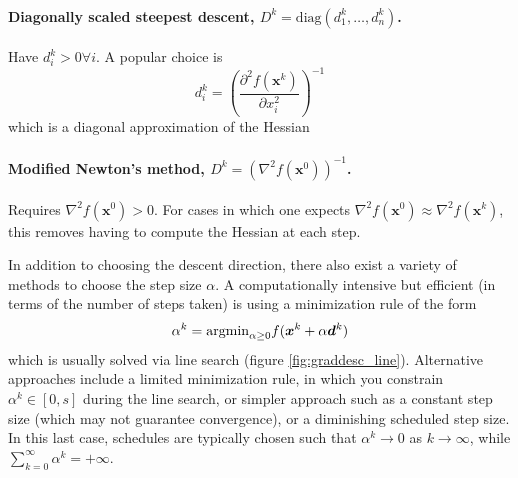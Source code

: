 \paragraph{Diagonally scaled steepest descent, $D^k = \textrm{diag}(d_1^k, \ldots, d_n^k)$.} Have $d_i^k >0 \forall i$. A popular choice is 
\begin{equation}
    d_i^k = \left( \frac{\partial^2 f(\bm{x}^k)}{\partial x_i^2} \right)^{-1}
\end{equation}
which is a diagonal approximation of the Hessian


\paragraph{Modified Newton's method, $D^k = (\nabla^2 f(\bm{x}^0))^{-1}$.} Requires $\nabla^2 f(\bm{x}^0) > 0$. For cases in which one expects $\nabla^2 f(\bm{x}^0) \approx \nabla^2 f(\bm{x}^k)$, this removes having to compute the Hessian at each step. 

In addition to choosing the descent direction, there also exist a variety of methods to choose the step size $\alpha$. A computationally intensive but efficient (in terms of the number of steps taken) is using a minimization rule of the form 
\begin{equation}
\alpha^k = \text{argmin}_{\alpha\geq 0} f(\bm{x}^k + \alpha \bm{d}^k)  
\end{equation}
which is usually solved via line search (figure \ref{fig:graddesc_line}). Alternative approaches include a limited minimization rule, in which you constrain $\alpha^k \in [0,s]$ during the line search, or simpler approach such as a constant step size (which may not guarantee convergence), or a diminishing scheduled step size. In this last case, schedules are typically chosen such that $\alpha^k \to 0$ as $k \to \infty$, while $\sum_{k=0}^\infty \alpha^k = +\infty$. 


